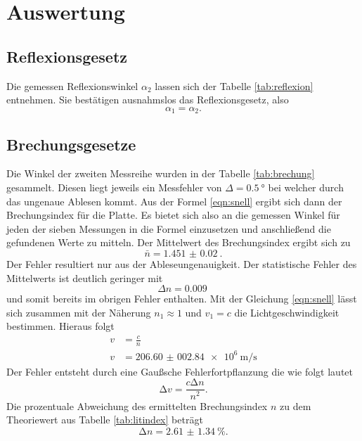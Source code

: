 \section{Auswertung}

\subsection{Reflexionsgesetz}
Die gemessen Reflexionswinkel $\alpha_2$ lassen sich der Tabelle \ref{tab:reflexion} entnehmen. Sie bestätigen ausnahmslos
das Reflexionsgesetz, also %
\begin{equation*}
    \alpha_1=\alpha_2.
\end{equation*}


\subsection{Brechungsgesetze}
\label{brechung}
Die Winkel der zweiten Messreihe wurden in der Tabelle \ref{tab:brechung} gesammelt. Diesen liegt jeweils ein Messfehler von
$\Delta = \SI{0.5}{\degree}$ bei welcher durch das ungenaue Ablesen kommt. Aus der Formel \eqref{eqn:snell} ergibt sich dann 
der Brechungsindex für die Platte. Es bietet sich also an die gemessen Winkel für jeden der sieben Messungen in die Formel einzusetzen 
und anschließend die gefundenen Werte zu mitteln. Der Mittelwert des Brechungsindex ergibt sich zu
\begin{equation}
    \label{eqn:n}
    \bar{n} = \SI{1.451(0020)}{}.
\end{equation}
Der Fehler resultiert nur aus der Ableseungenauigkeit. Der statistische Fehler des Mittelwerts ist deutlich geringer mit
\begin{equation*}
    \Delta n = \SI{0.009}{}
\end{equation*}
und somit bereits im obrigen Fehler enthalten. Mit der Gleichung \eqref{eqn:snell} lässt sich zusammen mit der Näherung $n_1 \approx 1$
und $v_1 = c$ \cite{scipy} die Lichtgeschwindigkeit bestimmen. Hieraus folgt
\begin{align*}
    v &= \frac{c}{n} \\
    v &= \SI{206.60(00284)e6}{\meter\per\second}
\end{align*}
Der Fehler entsteht durch eine Gaußsche Fehlerfortpflanzung die wie folgt lautet
\begin{equation}
    \increment v = \frac{c \increment n}{n^2}.
\end{equation}
Die prozentuale Abweichung des ermittelten Brechungsindex $n$ zu dem Theoriewert aus Tabelle \ref{tab:litindex} beträgt
\begin{equation}
    \label{eqn:prozn}
\increment n = \SI{2.61(134)}{\percent}.
\end{equation}

